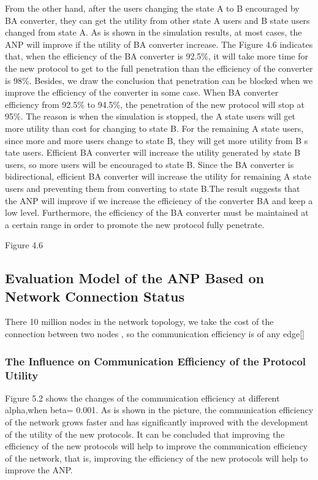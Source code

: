 \documentclass{article}
\begin{document}
From the other hand, after the users changing the state A to B encouraged by BA converter, they can get the utility from 
other state A users and  B state users changed from state A. As is shown in the simulation results, at most cases, 
the ANP will improve if the utility of BA converter increase. The Figure 4.6 indicates that, when the efficiency of 
the BA converter is 92.5\%, it will take more time for the new protocol to get to the full penetration than the efficiency of 
the converter is 98\%. Besides, we draw the conclusion that penetration can be blocked when we improve the efficiency of 
the converter in some case. When BA converter efficiency from 92.5\% to 94.5\%,  the penetration of the new protocol will 
stop at 95\%. The reason is when the simulation is stopped, the A state users will get more utility than cost for changing 
to state B. For the remaining A state users, since more and more users change to state B, they will get more utility from B s
tate users.   Efficient BA converter will increase the utility generated by state B users, so more users will be encouraged to 
state B. Since the BA converter is bidirectional, efficient BA converter will increase the utility for remaining A state users 
and preventing them from converting to state B.The result suggests that the ANP will improve if we increase the efficiency of 
the converter BA and keep a low level. Furthermore, the efficiency of the BA converter must be maintained at a certain range 
in order to promote the new protocol fully penetrate.

Figure 4.6

\subsection{Evaluation Model of the ANP Based on Network Connection Status}
There 10 million nodes in the network topology, we take the cost of the connection between two nodes , so the communication 
efficiency is of any edge[]
\subsubsection{The Influence on Communication Efficiency  of the Protocol Utility}
Figure 5.2 shows the changes of the communication efficiency at different alpha,when beta= 0.001. As is shown in the picture, 
the communication efficiency of the network grows faster and has significantly improved with the development of the utility 
of the new protocols. It can be concluded that improving the efficiency of the new protocols will help to improve the communication 
efficiency of the network, that is, improving the efficiency of the new protocols will help to improve the ANP.
\end{document}
